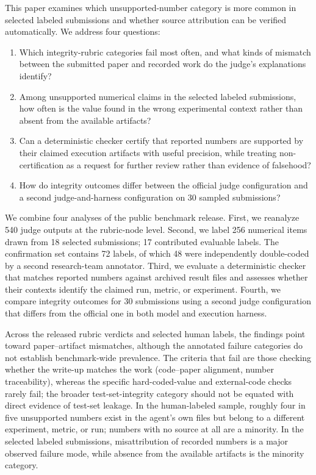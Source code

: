 \documentclass[preprint,12pt,authoryear]{elsarticle}
\begin{document}
This paper examines which unsupported-number category is more common in selected labeled submissions and whether source attribution can be verified automatically. We address four questions:
\begin{enumerate}
  \item[\textbf{RQ1}] Which integrity-rubric categories fail most often, and what kinds of mismatch between the submitted paper and recorded work do the judge's explanations identify?
  \item[\textbf{RQ2}] Among unsupported numerical claims in the selected labeled submissions, how often is the value found in the wrong experimental context rather than absent from the available artifacts?
  \item[\textbf{RQ3}] Can a deterministic checker certify that reported numbers are supported by their claimed execution artifacts with useful precision, while treating non-certification as a request for further review rather than evidence of falsehood?
  \item[\textbf{RQ4}] How do integrity outcomes differ between the official judge configuration and a second judge-and-harness configuration on 30 sampled submissions?
\end{enumerate}

We combine four analyses of the public benchmark release. First, we reanalyze 540 judge outputs at the rubric-node level. Second, we label 256 numerical items drawn from 18 selected submissions; 17 contributed evaluable labels. The confirmation set contains 72 labels, of which 48 were independently double-coded by a second research-team annotator. Third, we evaluate a deterministic checker that matches reported numbers against archived result files and assesses whether their contexts identify the claimed run, metric, or experiment. Fourth, we compare integrity outcomes for 30 submissions using a second judge configuration that differs from the official one in both model and execution harness.

Across the released rubric verdicts and selected human labels, the findings point toward paper--artifact mismatches, although the annotated failure categories do not establish benchmark-wide prevalence. The criteria that fail are those checking whether the write-up matches the work (code--paper alignment, number traceability), whereas the specific hard-coded-value and external-code checks rarely fail; the broader test-set-integrity category should not be equated with direct evidence of test-set leakage. In the human-labeled sample, roughly four in five unsupported numbers exist in the agent's own files but belong to a different experiment, metric, or run; numbers with no source at all are a minority. In the selected labeled submissions, misattribution of recorded numbers is a major observed failure mode, while absence from the available artifacts is the minority category.
\end{document}
